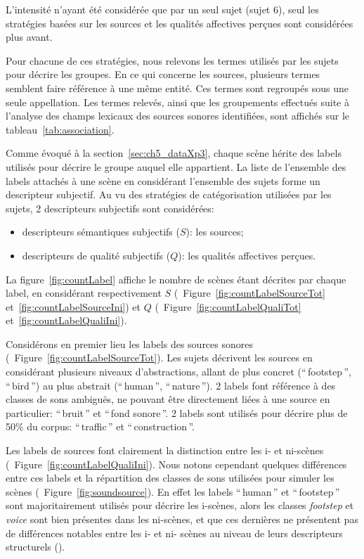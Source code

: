L'intensité n'ayant été considérée que par un seul sujet (sujet 6), seul les stratégies basées sur les sources et les qualités affectives perçues sont considérées plus avant.

Pour chacune de ces stratégies, nous relevons les termes utilisés par les sujets pour décrire les groupes. En ce qui concerne les sources, plusieurs termes semblent faire référence à une même entité. Ces termes sont regroupés sous une seule appellation. Les termes relevés, ainsi que les groupements effectués suite à l'analyse des champs lexicaux des sources sonores identifiées, sont affichés sur le tableau~\ref{tab:association}.

Comme évoqué à la section~\ref{sec:ch5_dataXp3}, chaque scène hérite des labels utilisés pour décrire le groupe auquel elle appartient. La liste de l'ensemble des labels attachés à une scène en considérant l'ensemble des sujets forme un descripteur subjectif. Au vu des stratégies de catégorisation utilisées par les sujets, 2 descripteurs subjectifs sont considérées:

\begin{itemize}
\item descripteurs sémantiques subjectifs ($S$): les sources;
\item descripteurs de qualité subjectifs ($Q$): les qualités affectives perçues.
\end{itemize}

La figure~\ref{fig:countLabel} affiche le nombre de scènes étant décrites par chaque label, en considérant respectivement $S$ (\cf~Figure~\ref{fig:countLabelSourceTot} et~\ref{fig:countLabelSourceIni}) et $Q$ (\cf~Figure~\ref{fig:countLabelQualiTot} et~\ref{fig:countLabelQualiIni}).

Considérons en premier lieu les labels des sources sonores (\cf~Figure~\ref{fig:countLabelSourceTot}). Les sujets décrivent les sources en considérant plusieurs niveaux d'abstractions, allant de plus concret (``\,footstep\,'', ``\,bird\,'') au plus abstrait (``\,human\,'', ``\,nature\,''). 2 labels font référence à des classes de sons ambiguës, ne pouvant être directement liées à une source en particulier: ``\,bruit\,'' et ``\,fond sonore\,''. 2 labels sont utilisés pour décrire plus de 50\% du corpus: ``\,traffic\,'' et ``\,construction\,''. 

Les labels de sources font clairement la distinction entre les i- et ni-scènes (\cf~Figure~\ref{fig:countLabelQualiIni}). Nous notons cependant quelques différences entre ces labels et la répartition des classes de sons utilisées pour simuler les scènes (\cf~Figure~\ref{fig:soundsource}).  En effet les labels ``\,human\,'' et ``\,footstep\,'' sont majoritairement utilisés pour décrire les i-scènes, alors les classes \emph{footstep} et \emph{voice} sont bien présentes dans les ni-scènes, et que ces dernières ne présentent pas de différences notables entre les i- et ni- scènes au niveau de leurs descripteurs structurels (). 
 
